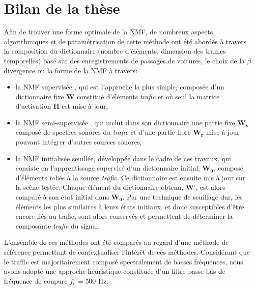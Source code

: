 \section*{Bilan de la thèse}
Afin de trouver une forme optimale de la NMF, de nombreux aspects algorithmiques et de paramétrisation de cette méthode ont été abordés  à travers la composition du dictionnaire (nombre d'éléments, dimension des trames temporelles) basé sur des enregistrements de passages de voitures, le choix de la $\beta$ divergence ou la forme de la NMF à travers:
\begin{itemize}
\item la NMF supervisée \cite{lee_learning_1999,fevotte_algorithms_2011}, qui est l'approche la plus simple, composée d'un dictionnaire fixe $ \mathbf{W}$ constitué d'éléments \textit{trafic} et où seul la matrice d'activation $\mathbf{H}$ est mise à jour,
\item la NMF semi-supervisée \cite{lee_semi-supervised_2010,kitamura2014music}, qui inclut dans son  dictionnaire une partie fixe $\mathbf{W_s}$ composé de spectres sonores du \textit{trafic} et d'une partie libre $\mathbf{W_r}$ mise à jour pouvant intégrer d'autres sources sonores,
\item la NMF initialisée seuillée, développée dans le cadre de ces travaux, qui consiste en l'apprentissage supervisé d'un dictionnaire initial, $\mathbf{W_0}$, composé d'éléments reliés à la source \textit{trafic}. Ce dictionnaire est ensuite mis à jour sur la scène testée. Chaque élément du dictionnaire obtenu, $\mathbf{W'}$, est alors comparé à son état initial dans $\mathbf{W_0}$. Par une technique de seuillage dur, les éléments les plus similaires à leurs états initiaux, et donc susceptibles d'être encore liés au trafic, sont alors conservés et permettent de déterminer la composante \textit{trafic} du signal.
\end{itemize}

L'ensemble de ces méthodes ont été comparés au regard d'une méthode de référence permettant de contextualiser l'intérêt de ces méthodes. Considérant que le traffic est majoritairement composé spectralement de basses fréquences, nous avons adopté une approche heuristique constituée d'un filtre passe-bas de fréquence de coupure $f_c$ = 500 Hz.

